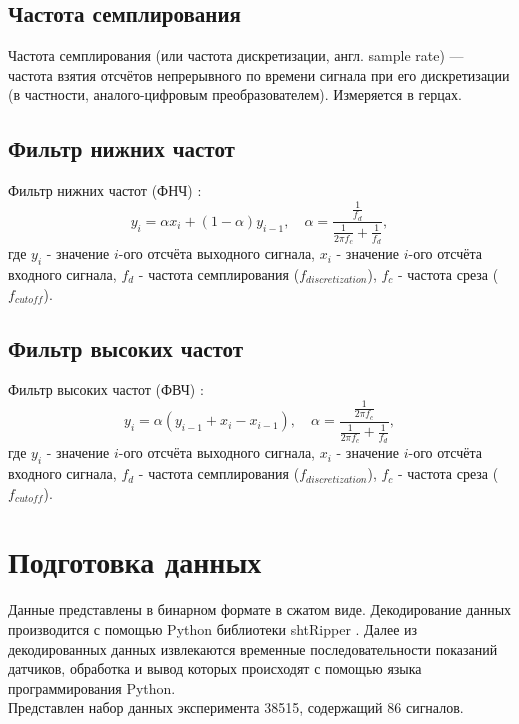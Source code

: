\documentclass[12pt,a4paper]{article}
\begin{document}
		 \subsection{Частота семплирования}
		 Частота семплирования (или частота дискретизации, англ. sample rate) — частота взятия отсчётов непрерывного по времени сигнала при его дискретизации (в частности, аналого-цифровым преобразователем). Измеряется в герцах. \cite{sample_rate}
		 		 
		 \subsection{Фильтр нижних частот}
		 Фильтр нижних частот (ФНЧ) \cite{lp_filter}:
		 \begin{equation}\label{lp_filter}
		 	y_i=\alpha x_i + (1-\alpha)y_{i-1}, \quad \alpha = \frac{\frac{1}{f_d}}{\frac{1}{2\pi f_c}+\frac{1}{f_d}},
		 \end{equation}
		 где $y_i$ - значение $i$-ого отсчёта выходного сигнала, $x_i$ - значение $i$-ого отсчёта входного сигнала, $f_d$ - частота семплирования ($f_{discretization}$), $f_c$ - частота среза ($f_{cutoff}$).
		 
		 \subsection{Фильтр высоких частот}
		 Фильтр высоких частот (ФВЧ) \cite{hp_filter}:
		 \begin{equation} \label{hp_filter}
		 	y_i=\alpha(y_{i-1}+x_i-x_{i-1}), \quad \alpha = \frac{\frac{1}{2\pi f_c}}{\frac{1}{2\pi f_c}+\frac{1}{f_d}},
		 \end{equation}
		 где $y_i$ - значение $i$-ого отсчёта выходного сигнала, $x_i$ - значение $i$-ого отсчёта входного сигнала, $f_d$ - частота семплирования ($f_{discretization}$), $f_c$ - частота среза ($f_{cutoff}$).
		 
	\newpage
	
	\section{Подготовка данных}
		Данные представлены в бинарном формате в сжатом виде. Декодирование данных производится с помощью Python библиотеки shtRipper \cite{shtRipper}. Далее из декодированных данных извлекаются	временные последовательности показаний датчиков, обработка и вывод которых происходят с помощью языка программирования Python.\\
		Представлен набор данных эксперимента 38515, содержащий 86 сигналов.
		
\end{document}
